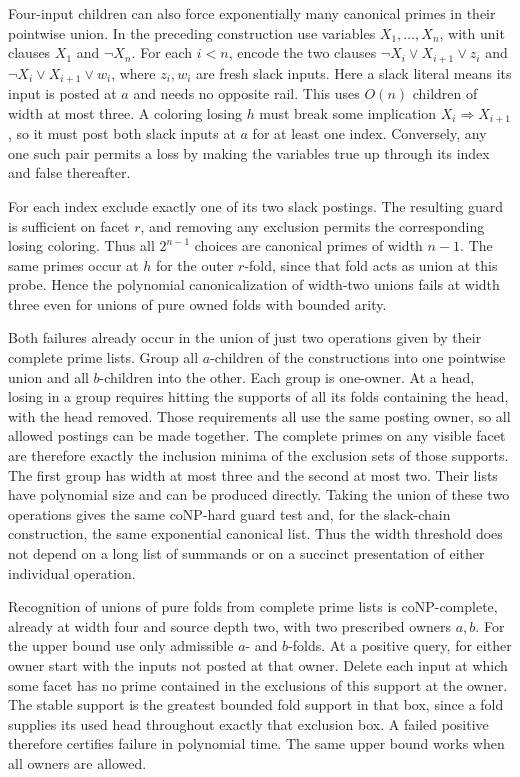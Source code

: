 Four-input children can also force exponentially many
canonical primes in their pointwise union. In the preceding
construction use variables $X_1,\ldots,X_n$, with unit clauses
$X_1$ and $\neg X_n$. For each $i<n$, encode the two clauses
$\neg X_i\lor X_{i+1}\lor z_i$ and
$\neg X_i\lor X_{i+1}\lor w_i$, where $z_i,w_i$ are fresh
slack inputs. Here a slack literal means its input is posted
at $a$ and needs no opposite rail. This uses $O(n)$ children
of width at most three. A coloring losing $h$ must break
some implication $X_i\Rightarrow X_{i+1}$, so it must post
both slack inputs at $a$ for at least one index. Conversely,
any one such pair permits a loss by making the variables
true up through its index and false thereafter.

For each index exclude exactly one of its two slack postings.
The resulting guard is sufficient on facet $r$, and removing
any exclusion permits the corresponding losing coloring.
Thus all $2^{n-1}$ choices are canonical primes of width $n-1$.
The same primes occur at $h$ for the outer $r$-fold, since
that fold acts as union at this probe. Hence the polynomial
canonicalization of width-two unions fails at width three
even for unions of pure owned folds with bounded arity.

Both failures already occur in the union of just two
operations given by their complete prime lists. Group all
$a$-children of the constructions into one pointwise union
and all $b$-children into the other. Each group is one-owner.
At a head, losing in a group requires hitting the supports
of all its folds containing the head, with the head removed.
Those requirements all use the same posting owner, so all
allowed postings can be made together. The complete primes
on any visible facet are therefore exactly the inclusion
minima of the exclusion sets of those supports. The first
group has width at most three and the second at most two.
Their lists have polynomial size and can be produced directly.
Taking the union of these two operations gives the same
coNP-hard guard test and, for the slack-chain construction,
the same exponential canonical list. Thus the width threshold
does not depend on a long list of summands or on a succinct
presentation of either individual operation.

Recognition of unions of pure folds from complete prime
lists is coNP-complete, already at width four and source
depth two, with two prescribed owners $a,b$. For the upper
bound use only admissible $a$- and $b$-folds. At a positive
query, for either owner start with the inputs not posted at
that owner. Delete each input at which some facet has no
prime contained in the exclusions of this support at the
owner. The stable support is the greatest bounded fold
support in that box, since a fold supplies its used head
throughout exactly that exclusion box. A failed positive
therefore certifies failure in polynomial time. The same
upper bound works when all owners are allowed.

